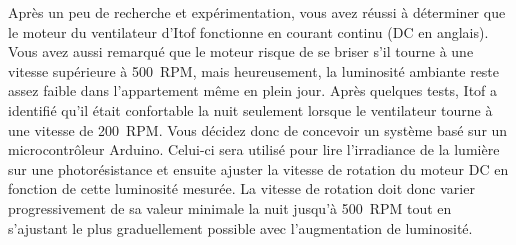\documentclass[english,french,12pt]{article}
\begin{document}
Après un peu de recherche et expérimentation, vous avez réussi à déterminer que le moteur du ventilateur d’Itof fonctionne en courant continu (DC en anglais). Vous avez aussi remarqué que le moteur risque de se briser s'il tourne à une vitesse supérieure à 500~RPM, mais heureusement, la luminosité ambiante reste assez faible dans l'appartement même en plein jour. Après quelques tests, Itof a identifié qu’il était confortable la nuit seulement lorsque le ventilateur tourne à une vitesse de 200~RPM. Vous décidez donc de concevoir un système basé sur un microcontrôleur Arduino. Celui-ci sera utilisé pour lire l'irradiance de la lumière sur une photorésistance et ensuite ajuster la vitesse de rotation du moteur DC en fonction de cette luminosité mesurée. La vitesse de rotation doit donc varier progressivement de sa valeur minimale la nuit jusqu'à 500~RPM tout en s'ajustant le plus graduellement possible avec l'augmentation de luminosité.

\end{document}
